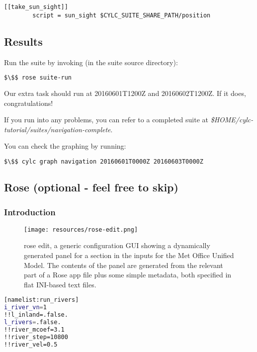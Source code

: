 \lstset{language=suiterc}
\begin{lstlisting}[columns=fullflexible]
    [[take_sun_sight]]
        script = sun_sight $CYLC_SUITE_SHARE_PATH/position
\end{lstlisting}

\subsection{Results}

Run the suite by invoking (in the suite source directory):
\begin{lstlisting}[mathescape, language=bash]
$\$$ rose suite-run
\end{lstlisting}

Our extra task should run at 20160601T1200Z and 20160602T1200Z. If it does, congratulations!

If you run into any problems, you can refer to a completed suite at {\em \$HOME/cylc-tutorial/suites/navigation-complete}.

You can check the graphing by running:

\begin{lstlisting}[mathescape, language=bash]
$\$$ cylc graph navigation 20160601T0000Z 20160603T0000Z
\end{lstlisting}

\subsection{Rose (optional - feel free to skip)}
\label{Rose}

\subsubsection{Introduction}

\begin{figure}[h]
\texttt{[image: resources/rose-edit.png]}
\caption{rose edit, a generic configuration GUI showing a dynamically generated panel for a section in the inputs for the Met Office Unified Model. The contents of the panel are generated from the relevant part of a Rose app file plus some simple metadata, both specified in flat INI-based text files. \label{rose edit}}
\end{figure}

\begin{lstlisting}[mathescape, language=bash, title={rose-app.conf snippet used to drive Figure~\ref{rose edit}}]
[namelist:run_rivers]
i_river_vn=1
!!l_inland=.false.
l_rivers=.false.
!!river_mcoef=3.1
!!river_step=10800
!!river_vel=0.5
\end{lstlisting}

